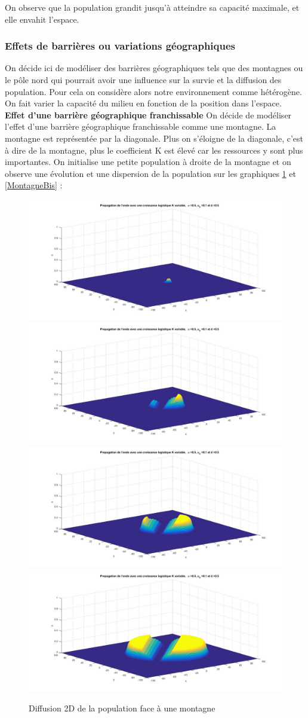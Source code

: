 \documentclass[a4paper,11pt]{article}
\begin{document}
On observe que la population grandit jusqu'à atteindre sa capacité maximale, et elle envahit l'espace.

\subsubsection{Effets de barrières ou variations géographiques }
On décide ici de modéliser des barrières géographiques tels que des montagnes ou le pôle nord qui pourrait avoir une influence sur la survie et la diffusion des population.
Pour cela on considère alors notre environnement comme hétérogène. On fait varier la capacité du milieu en fonction de la position dans l'espace.\\

\textbf{Effet d'une barrière géographique franchissable}
On décide de modéliser l'effet d'une barrière géographique franchissable comme une montagne. La montagne est représentée par la diagonale. Plus on s'éloigne de la diagonale, c'est à dire de la montagne, plus le coefficient K est élevé car les ressources y sont plus importantes. On initialise une petite population à droite de la montagne et on observe une évolution et une dispersion de la population sur les graphiques  \ref{Montagne} et \ref{MontagneBis} : 
\begin{figure}[H]
	\centering
	\includegraphics[width=0.5\linewidth]{SimulationKPP/Enviro/montagne1}\hfill
	\includegraphics[width=0.5\linewidth]{SimulationKPP/Enviro/montagne3}\hfill
	\includegraphics[width=0.5\linewidth]{SimulationKPP/Enviro/montagne5}\hfill
	\includegraphics[width=0.5\linewidth]{SimulationKPP/Enviro/montagne8}
	\caption{Diffusion 2D de la population face à une montagne}
	\label{Montagne}
\end{figure}
\end{document}
